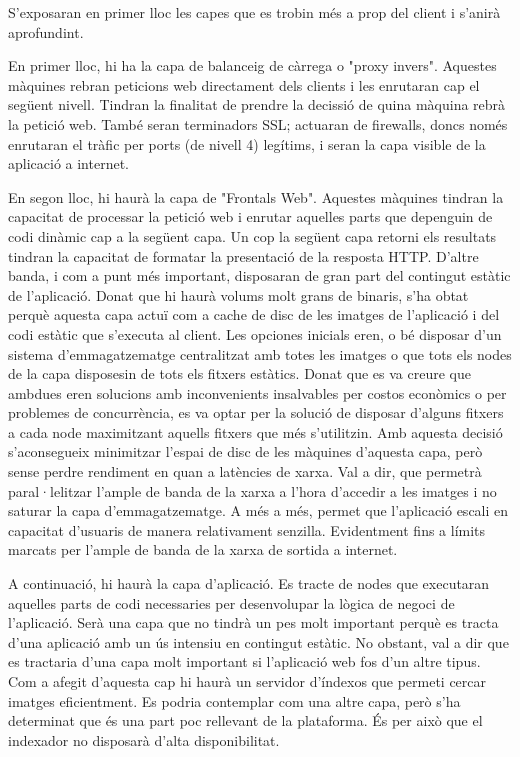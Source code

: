 \documentclass[a4paper, 11pt]{article}
\begin{document}
S'exposaran en primer lloc les capes que es trobin més a prop del client i s'anirà aprofundint.

En primer lloc, hi ha la capa de balanceig de càrrega o "proxy invers". Aquestes màquines rebran peticions web directament dels clients i les enrutaran cap el següent nivell. Tindran la finalitat de prendre la decissió de quina màquina rebrà la petició web. També seran terminadors SSL; actuaran de firewalls, doncs només enrutaran el tràfic per ports (de nivell 4) legítims, i seran la capa visible de la aplicació a internet.

En segon lloc, hi haurà la capa de "Frontals Web". Aquestes màquines tindran la capacitat de processar la petició web i enrutar aquelles parts que depenguin de codi dinàmic cap a la següent capa. Un cop la següent capa retorni els resultats tindran la capacitat de formatar la presentació de la resposta HTTP. D'altre banda, i com a punt més important, disposaran de gran part del contingut estàtic de l'aplicació. Donat que hi haurà volums molt grans de binaris, s'ha obtat perquè aquesta capa actuï com a cache de disc de les imatges de l'aplicació i del codi estàtic que s'executa al client. Les opciones inicials eren, o bé disposar d'un sistema d'emmagatzematge centralitzat amb totes les imatges o que tots els nodes de la capa disposesin de tots els fitxers estàtics. Donat que es va creure que ambdues eren solucions amb inconvenients insalvables per costos econòmics o per problemes de concurrència, es va optar per la solució de disposar d'alguns fitxers a cada node maximitzant aquells fitxers que més s'utilitzin.
Amb aquesta decisió s'aconsegueix minimitzar l'espai de disc de les màquines d'aquesta capa, però sense perdre rendiment en quan a latències de xarxa. Val a dir, que permetrà paral·lelitzar l'ample de banda de la xarxa a l'hora d'accedir a les imatges i no saturar la capa d'emmagatzematge. A més a més, permet que l'aplicació escali en capacitat d'usuaris de manera relativament senzilla. Evidentment fins a límits marcats per l'ample de banda de la xarxa de sortida a internet.   

A continuació, hi haurà la capa d'aplicació. Es tracte de nodes que executaran aquelles parts de codi necessaries per desenvolupar la lògica de negoci de l'aplicació. Serà una capa que no tindrà un pes molt important perquè es tracta d'una aplicació amb un ús intensiu en contingut estàtic. No obstant, val a dir que es tractaria d'una capa molt important si l'aplicació web fos d'un altre tipus.
Com a afegit d'aquesta cap hi haurà un servidor d'índexos que permeti cercar imatges eficientment. Es podria contemplar com una altre capa, però s'ha determinat que és una part poc rellevant de la plataforma. És per això que el indexador no disposarà d'alta disponibilitat.
\end{document}
